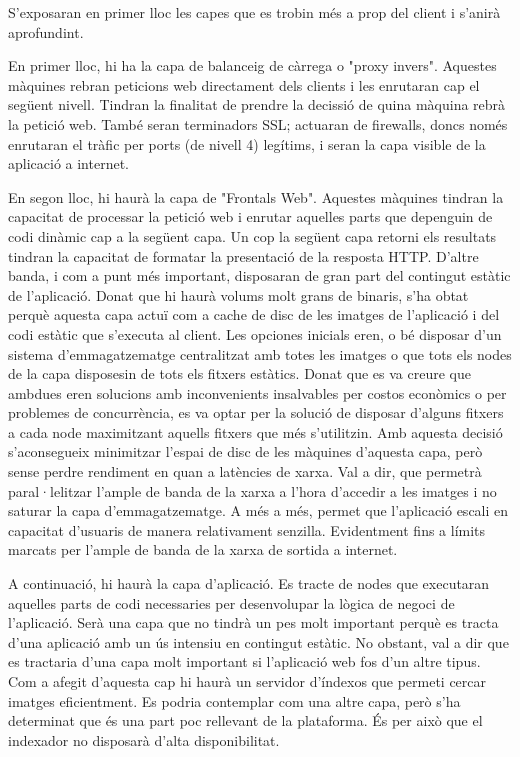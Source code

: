 \documentclass[a4paper, 11pt]{article}
\begin{document}
S'exposaran en primer lloc les capes que es trobin més a prop del client i s'anirà aprofundint.

En primer lloc, hi ha la capa de balanceig de càrrega o "proxy invers". Aquestes màquines rebran peticions web directament dels clients i les enrutaran cap el següent nivell. Tindran la finalitat de prendre la decissió de quina màquina rebrà la petició web. També seran terminadors SSL; actuaran de firewalls, doncs només enrutaran el tràfic per ports (de nivell 4) legítims, i seran la capa visible de la aplicació a internet.

En segon lloc, hi haurà la capa de "Frontals Web". Aquestes màquines tindran la capacitat de processar la petició web i enrutar aquelles parts que depenguin de codi dinàmic cap a la següent capa. Un cop la següent capa retorni els resultats tindran la capacitat de formatar la presentació de la resposta HTTP. D'altre banda, i com a punt més important, disposaran de gran part del contingut estàtic de l'aplicació. Donat que hi haurà volums molt grans de binaris, s'ha obtat perquè aquesta capa actuï com a cache de disc de les imatges de l'aplicació i del codi estàtic que s'executa al client. Les opciones inicials eren, o bé disposar d'un sistema d'emmagatzematge centralitzat amb totes les imatges o que tots els nodes de la capa disposesin de tots els fitxers estàtics. Donat que es va creure que ambdues eren solucions amb inconvenients insalvables per costos econòmics o per problemes de concurrència, es va optar per la solució de disposar d'alguns fitxers a cada node maximitzant aquells fitxers que més s'utilitzin.
Amb aquesta decisió s'aconsegueix minimitzar l'espai de disc de les màquines d'aquesta capa, però sense perdre rendiment en quan a latències de xarxa. Val a dir, que permetrà paral·lelitzar l'ample de banda de la xarxa a l'hora d'accedir a les imatges i no saturar la capa d'emmagatzematge. A més a més, permet que l'aplicació escali en capacitat d'usuaris de manera relativament senzilla. Evidentment fins a límits marcats per l'ample de banda de la xarxa de sortida a internet.   

A continuació, hi haurà la capa d'aplicació. Es tracte de nodes que executaran aquelles parts de codi necessaries per desenvolupar la lògica de negoci de l'aplicació. Serà una capa que no tindrà un pes molt important perquè es tracta d'una aplicació amb un ús intensiu en contingut estàtic. No obstant, val a dir que es tractaria d'una capa molt important si l'aplicació web fos d'un altre tipus.
Com a afegit d'aquesta cap hi haurà un servidor d'índexos que permeti cercar imatges eficientment. Es podria contemplar com una altre capa, però s'ha determinat que és una part poc rellevant de la plataforma. És per això que el indexador no disposarà d'alta disponibilitat.
\end{document}
